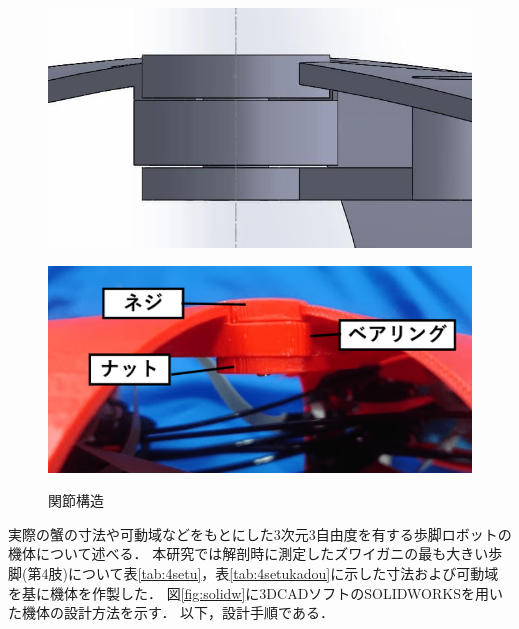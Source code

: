 \begin{figure}[t]
  \begin{minipage}{0.5\hsize}
    \centering
    \vspace{3mm}
    \includegraphics[scale=0.32]{image/bearingu.JPG}
    \label{fig:bearingus}
  \end{minipage}
  \begin{minipage}{0.5\hsize}
    \centering
    \vspace{7mm}
    \includegraphics[scale=0.2]{image/bearinguj.png}
    \label{fig:bearinguj}
  \end{minipage}
  \caption{関節構造}
  \label{fig:bearingu}
\end{figure}
実際の蟹の寸法や可動域などをもとにした3次元3自由度を有する歩脚ロボットの機体について述べる．
本研究では解剖時に測定したズワイガニの最も大きい歩脚(第4肢)について表\ref{tab:4setu}，表\ref{tab:4setukadou}に示した寸法および可動域を基に機体を作製した．
図\ref{fig:solidw}に3DCADソフトのSOLIDWORKSを用いた機体の設計方法を示す．
以下，設計手順である．
\vspace{3mm}

